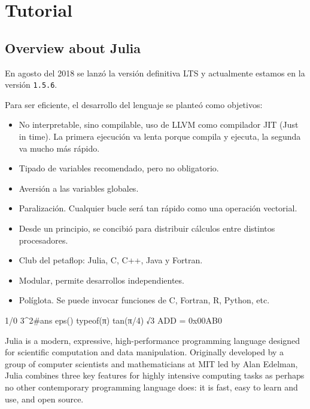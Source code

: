 \setpartpreamble{

  \

  \begin{center}
    
  \end{center}
}
\part{Tutorial}

\appendix

\chapter{Overview about Julia}

En agosto del 2018 se lanzó la versión definitiva LTS y actualmente
estamos en la versión  \texttt{1.5.6}.

Para ser eficiente, el desarrollo del lenguaje se planteó como
objetivos:

\begin{itemize}
  \item No interpretable, sino compilable, uso de LLVM como compilador JIT (Just in time).
        La primera ejecución va lenta porque compila y ejecuta, la segunda
        va mucho más rápido.
  \item Tipado de variables recomendado, pero no obligatorio.
  \item Aversión a las variables globales.
  \item Paralización.
        Cualquier bucle será tan rápido como una operación vectorial.
  \item Desde un principio, se concibió para distribuir cálculos
        entre distintos procesadores.
  \item Club del petaflop: Julia, C, C++, Java y Fortran.
  \item Modular, permite desarrollos independientes.
  \item Políglota. Se puede invocar funciones de C, Fortran, R,
        Python, etc.
\end{itemize}

\begin{juliaconsole}
  1/0
  3^2#ans
  eps()
  typeof(π)
  tan(π/4)
  √3
  ADD = 0x00AB0
\end{juliaconsole}

Julia is a modern, expressive, high-performance programming language designed for scientific computation and data manipulation.
Originally developed by a group of computer scientists and mathematicians at MIT led by Alan Edelman, Julia combines three key features for highly intensive computing tasks as perhaps no other contemporary programming language does: it is fast, easy to learn and use, and open source.

